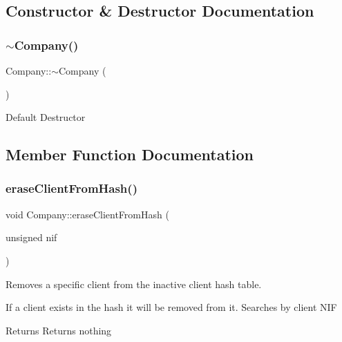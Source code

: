 \subsection{Constructor \& Destructor Documentation}
\mbox{\label{class_company_a61c2a9ec178e683310583ef15635b53c}} 
\subsubsection{\texorpdfstring{$\sim$\+Company()}{~Company()}}
{\footnotesize\ttfamily Company\+::$\sim$\+Company (\begin{DoxyParamCaption}{ }\end{DoxyParamCaption})}

Default Destructor 

\subsection{Member Function Documentation}
\mbox{\label{class_company_aab30d8d03d868006bb277fc8ead1c510}} 
\subsubsection{\texorpdfstring{erase\+Client\+From\+Hash()}{eraseClientFromHash()}}
{\footnotesize\ttfamily void Company\+::erase\+Client\+From\+Hash (\begin{DoxyParamCaption}\item[{unsigned}]{nif }\end{DoxyParamCaption})}



Removes a specific client from the inactive client hash table. 

If a client exists in the hash it will be removed from it. Searches by client N\+IF

\begin{DoxyReturn}{Returns}
Returns nothing 
\end{DoxyReturn}
\mbox{\label{class_company_ae8efdaf521467fd204c8d272f4469679}} 
